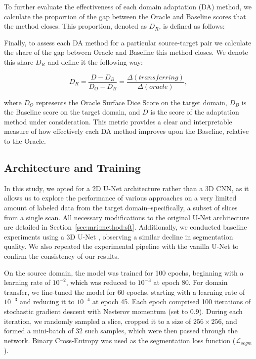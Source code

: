 To further evaluate the effectiveness of each domain adaptation (DA) method, we calculate the proportion of the gap between the Oracle and Baseline scores that the method closes. This proportion, denoted as $D_R$, is defined as follows:

Finally, to assess each DA method for a particular source-target pair we calculate the share of the gap between Oracle and Baseline this method closes. We denote this share $D_R$ and define it the following way:

\begin{equation}
	D_R = \dfrac{D - D_B}{D_O - D_B} = \dfrac{\Delta(transferring)}{\Delta(oracle)},
\end{equation}

\noindent
where $D_O$ represents the Oracle Surface Dice Score on the target domain, $D_B$ is the Baseline score on the target domain, and $D$ is the score of the adaptation method under consideration. This metric provides a clear and interpretable measure of how effectively each DA method improves upon the Baseline, relative to the Oracle.


\subsection{Architecture and Training}

In this study, we opted for a 2D U-Net architecture \cite{ronneberger2015u} rather than a 3D CNN, as it allows us to explore the performance of various approaches on a very limited amount of labeled data from the target domain--specifically, a subset of slices from a single scan. All necessary modifications to the original U-Net architecture are detailed in Section~\ref{sec:mri:method:sft}. Additionally, we conducted baseline experiments using a 3D U-Net \cite{cciccek20163d}, observing a similar decline in segmentation quality. We also repeated the experimental pipeline with the vanilla U-Net to confirm the consistency of our results.

On the source domain, the model was trained for 100 epochs, beginning with a learning rate of $10^{-2}$, which was reduced to $10^{-3}$ at epoch 80. For domain transfer, we fine-tuned the model for 60 epochs, starting with a learning rate of $10^{-3}$ and reducing it to $10^{-4}$ at epoch 45. Each epoch comprised 100 iterations of stochastic gradient descent with Nesterov momentum (set to $0.9$). During each iteration, we randomly sampled a slice, cropped it to a size of $256 \times 256$, and formed a mini-batch of $32$ such samples, which were then passed through the network. Binary Cross-Entropy was used as the segmentation loss function ($\mathcal{L}_{segm}$).

